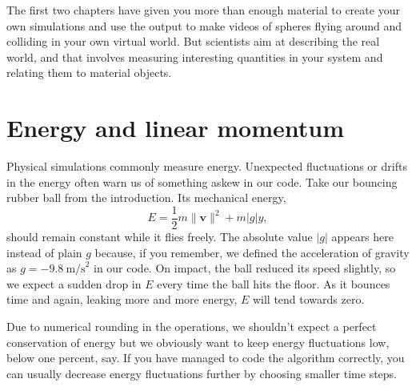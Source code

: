 
The first two chapters have given you more than enough material to create your 
own simulations and use the output to make videos of spheres flying around and 
colliding in your own virtual world. But scientists aim at describing the real 
world, and that involves measuring interesting quantities in your system and 
relating them to material objects.

\section{Energy and linear momentum}

Physical simulations commonly measure energy. Unexpected fluctuations or drifts 
in the energy often warn us of something askew in our code. Take our bouncing 
rubber ball from the introduction. Its mechanical energy,
\begin{equation*}
  E = \frac{1}{2} m \|\mathbf{v}\|^2 + m|g|y,
\end{equation*}
should remain constant while it flies freely. The absolute value $|g|$ appears 
here instead of plain $g$ because, if you remember, we defined the acceleration 
of gravity as $g = -9.8\ \mathrm{m/s}^2$ in our code. On impact, the ball 
reduced its speed slightly, so we expect a sudden drop in $E$ every time 
the ball hits the floor. As it bounces time and again, leaking more and more 
energy, $E$ will tend towards zero.

Due to numerical rounding in the operations, we shouldn't expect a perfect 
conservation of energy but we obviously want to keep energy fluctuations low, 
below one percent, say. If you have managed to code the algorithm correctly, you 
can usually decrease energy fluctuations further by choosing smaller time steps.

